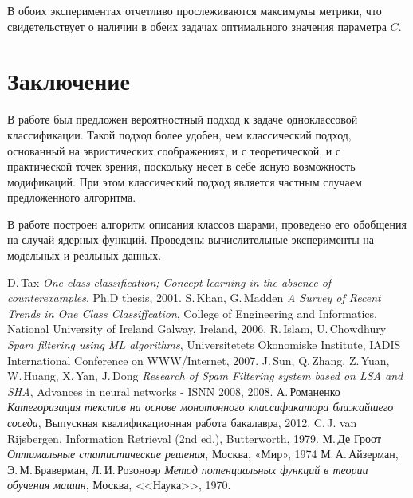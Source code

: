 \documentclass[12pt]{article}
\begin{document}
	В обоих экспериментах отчетливо прослеживаются максимумы метрики, что свидетельствует о наличии в обеих задачах оптимального значения параметра $C.$


\section{Заключение}						
	В работе был предложен вероятностный подход к задаче одноклассовой классификации. Такой подход более удобен, чем классический подход, основанный на эвристических соображениях, и с теоретической, и с практической точек зрения, поскольку несет в себе ясную возможность модификаций. При этом классический подход является частным случаем предложенного алгоритма.

	В работе построен алгоритм описания классов шарами, проведено его обобщения на случай ядерных функций. Проведены вычислительные эксперименты на модельных и реальных данных.


\begin{thebibliography}{99}
	 D.\,Tax \textit{One-class classification; Concept-learning in the absence of
	counterexamples}, Ph.D thesis, 2001.
	 S.\,Khan, G.\,Madden \textit{A Survey of Recent Trends in One Class
	Classiffcation}, College of Engineering and Informatics, National University of Ireland Galway,
	Ireland, 2006.
	 R.\,Islam, U.\,Chowdhury \textit{Spam filtering using ML algorithms}, Universitetets Okonomiske Institute, IADIS International Conference on WWW/Internet, 2007.
	 J.\,Sun, Q.\,Zhang, Z.\,Yuan, W.\,Huang, X.\,Yan, J.\,Dong \textit{Research of Spam Filtering system based on LSA and SHA}, Advances in neural networks - ISNN 2008, 2008.
	 А.\,Романенко  \textit{Категоризация текстов на основе монотонного
	классификатора ближайшего соседа}, Выпускная квалификационная работа бакалавра, 2012.
	 C.\,J. van Rijsbergen, Information Retrieval (2nd ed.), Butterworth, 1979.
	М.\,Де Гроот \textit{Оптимальные статистические решения}, Москва, «Мир», 1974
	 М.\,А.\,Айзерман, Э.\,М.\,Браверман, Л.\,И.\,Розоноэр \textit{Метод потенциальных функций в теории обучения машин}, Москва, <<Наука>>, 1970.
\end{thebibliography}
\end{document}
